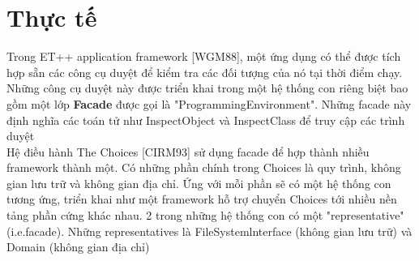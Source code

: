\section{Thực tế}

Trong ET++ application framework [WGM88], một ứng dụng có thể được tích hợp sẵn các công cụ duyệt để kiểm tra các đối tượng của nó tại thời điểm chạy. Những công cụ duyệt này được triển khai trong một hệ thống con riêng biệt bao gồm một lớp \textbf{Facade} được gọi là "ProgrammingEnvironment". Những facade này định nghĩa các toán tử như InspectObject và InspectClass để truy cập các trình duyệt\\[0.1in]
Hệ điều hành The Choices [CIRM93] sử dụng facade để hợp thành nhiều framework thành một. Có những phần chính trong Choices là quy trình, không gian lưu trữ và không gian địa chỉ. Ứng với mỗi phần sẽ có một hệ thống con tương ứng, triển khai như một framework hỗ trợ chuyển Choices tới nhiều nền tảng phần cứng khác nhau. 2 trong những hệ thống con có một "representative" (i.e.facade). Những representatives là FileSystemlnterface (không gian lưu trữ) và Domain (không gian địa chỉ)

\newpage
